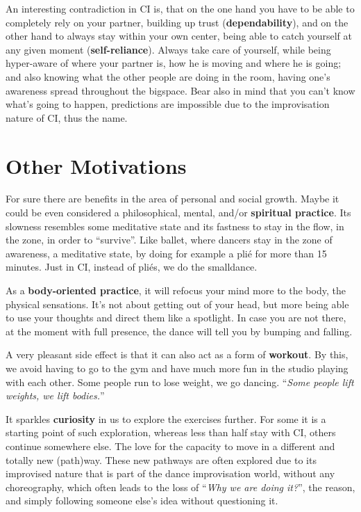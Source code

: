 An interesting contradiction in CI is, that on the one hand you have to be able to completely rely on your partner, building up trust (\textbf{dependability}), and on the other hand to always stay within your own center, being able to catch yourself at any given moment (\textbf{self-reliance}).
Always take care of yourself, while being hyper-aware of where your partner is, how he is moving and where he is going;
and also knowing what the other people are doing in the room, having one's awareness spread throughout the \gls{bigspace}.
Bear also in mind that you can't know what's going to happen, predictions are impossible due to the improvisation nature of CI, thus the name.

\section{Other Motivations}\label{sec:other-motivations}

For sure there are benefits in the area of personal and social growth.
Maybe it could be even considered a philosophical, mental, and/or \textbf{spiritual practice}.
Its slowness resembles some meditative state and its fastness to stay in the flow, in the zone, in order to ``survive''.
Like ballet, where dancers stay in the zone of awareness, a meditative state, by doing for example a plié for more than 15 minutes.
Just in CI, instead of pliés, we do the \gls{smalldance}.

As a \textbf{body-oriented practice}, it will refocus your mind more to the body, the physical sensations.
It's not about getting out of your head, but more being able to use your thoughts and direct them like a spotlight.
In case you are not there, at the moment with full presence, the dance will tell you by bumping and falling.

A very pleasant side effect is that it can also act as a form of \textbf{workout}.
By this, we avoid having to go to the gym and have much more fun in the studio playing with each other.
Some people run to lose weight, we go dancing.
``\textit{Some people lift weights, we lift bodies.}''

It sparkles \textbf{curiosity} in us to explore the exercises further.
For some it is a starting point of such exploration, whereas less than half stay with CI, others continue somewhere else.
The love for the capacity to move in a different and totally new (path)way.
These new pathways are often explored due to its improvised nature that is part of the dance improvisation world, without any choreography, which often leads to the loss of ``\textit{Why we are doing it?}'', the reason, and simply following someone else's idea without questioning it.

